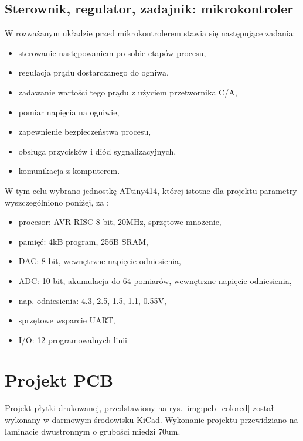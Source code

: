\documentclass[polish,engineer]{polsl-msth}
\begin{document}
\subsection{Sterownik, regulator, zadajnik: mikrokontroler}
W rozważanym układzie przed mikrokontrolerem stawia się następujące zadania:
\begin{itemize}
    \item sterowanie następowaniem po sobie etapów procesu,
    \item regulacja prądu dostarczanego do ogniwa,
    \item zadawanie wartości tego prądu z użyciem przetwornika C/A,
    \item pomiar napięcia na ogniwie,
    \item zapewnienie bezpieczeństwa procesu,
    \item obsługa przycisków i diód sygnalizacyjnych,
    \item komunikacja z komputerem.
\end{itemize}
W tym celu wybrano jednostkę ATtiny414, której istotne dla projektu parametry wyszczególniono poniżej, za \cite{tiny414datasheet}:
\begin{itemize}
    \item procesor: AVR RISC 8 bit, 20MHz, sprzętowe mnożenie,
    \item pamięć: 4kB program, 256B SRAM,
    \item DAC: 8 bit, wewnętrzne napięcie odniesienia,
    \item ADC: 10 bit, akumulacja do 64 pomiarów, wewnętrzne napięcie odniesienia, 
    \item nap. odniesienia: 4.3, 2.5, 1.5, 1.1, 0.55V,
    \item sprzętowe wsparcie UART,
    \item I/O: 12 programowalnych linii
\end{itemize}

\section{Projekt PCB}
Projekt płytki drukowanej, przedstawiony na rys. \ref{img:pcb_colored} został wykonany w darmowym środowisku KiCad. Wykonanie projektu przewidziano na laminacie dwustronnym o grubości miedzi 70um.
\end{document}
